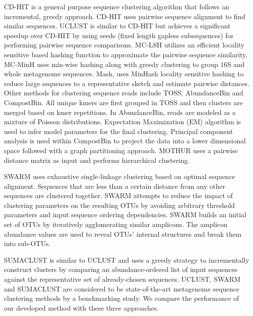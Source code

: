 \documentclass[letterpaper,twocolumn]{article}
\begin{document}
CD-HIT\cite{MARCDhit} is a 
general purpose sequence clustering algorithm that 
follows an incremental, greedy approach. CD-HIT uses 
pairwise sequence alignment to find similar 
sequences. UCLUST\cite{MARuclust} is similar to CD-HIT but 
achieves a significant speedup over CD-HIT by using seeds (fixed length gapless subsequences) for 
performing pairwise sequence comparisons. MC-LSH\cite{MARMetaLSH} utilizes 
an efficient locality sensitive based hashing function to 
approximate the pairwise sequence similarity. MC-MinH\cite{MARMcMinH} uses 
min-wise\cite{MARMinWise} hashing along with 
greedy clustering to group 16S and whole metagenome sequences. Mash\cite{MAROtherMinH}, uses MinHash 
locality sensitive hashing 
to reduce large sequences to a representative sketch and 
estimate
pairwise distances. Other methods for clustering sequence 
reads include TOSS\cite{MARToss}, AbundanceBin\cite{MARAbundant} and CompostBin\cite{MARCompost}. All unique 
kmers are first grouped in TOSS and then clusters are merged 
based on kmer repetitions. In AbundanceBin, reads are modeled as a 
mixture of Poisson distributions. Expectation Maximization (EM) algorithm 
is used to infer model parameters for the final clustering. Principal 
component analysis is used within CompostBin to project the data into a 
lower dimensional space
followed with a graph partitioning approach. MOTHUR\cite{MARMothur} uses a pairwise distance matrix as 
input and performs hierarchical clustering. 

SWARM\cite{MARSwarm2} uses exhaustive single-linkage clustering 
based on optimal sequence alignment. Sequences that are less than 
a certain distance from any other sequences are 
clustered together. SWARM attempts to reduce the impact of clustering 
parameters on the resulting OTUs by avoiding arbitrary 
threshold parameters 
and input sequence ordering dependencies. SWARM builds 
an initial set of OTUs  by 
iteratively agglomerating similar amplicons. The amplicon abundance values are used to reveal 
OTUs’ internal structures and 
break them into sub-OTUs.

SUMACLUST\cite{MARSumaclust} is similar to UCLUST and uses 
a  greedy strategy to 
incrementally construct clusters by comparing an 
abundance-ordered list of input sequences against the 
representative set of already-chosen sequences.  UCLUST, SWARM and SUMACLUST are 
considered to be 
state-of-the-art metagenome sequence clustering methods by a 
benchmarking study\cite{MARopenDeNovo}.  We compare the performance of our developed method with these three approaches. 
\end{document}
